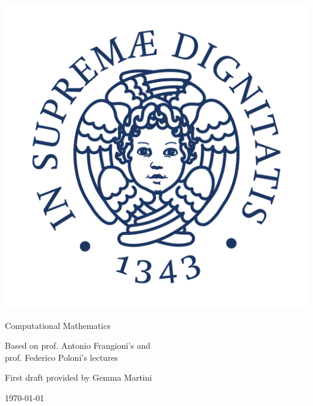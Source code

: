 \documentclass[preview,12pt]{article}
\begin{document}
\begin{titlepage}
\begin{center}
\vspace{3cm}

\Large

\vspace{2cm}

\includegraphics[scale=0.3]{pics/Cherubino.jpg}

\vspace{2.5cm}

{\Huge \sc Computational Mathematics}

\vspace{2cm}
Based on prof. Antonio Frangioni's and\\
  prof. Federico Poloni's lectures

\vspace{2cm}
First draft provided by Gemma Martini
\vfill

\today

\end{center}
\end{titlepage}


\tableofcontents
\let\tableofcontents\relax

\newpage
\end{document}
